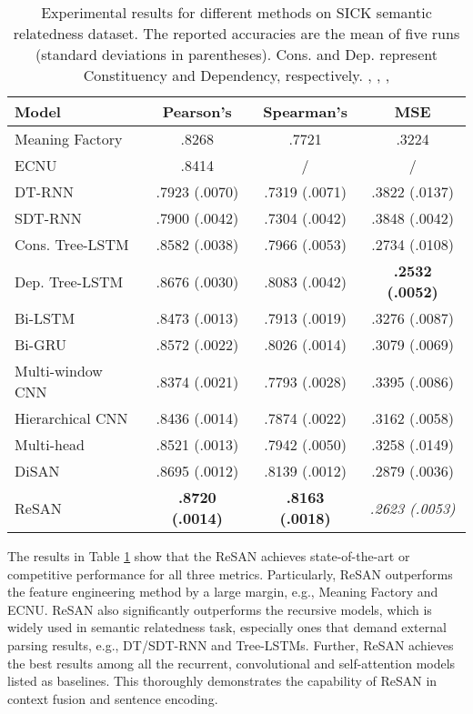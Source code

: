 \documentclass{article}
\begin{document}
\begin{table}[t] \small \centering
	\setlength{\tabcolsep}{1pt}
	\begin{tabular}{@{}lccc@{}}
		\toprule
		\textbf{Model}& \textbf{Pearson's } &\textbf{Spearman's }& \textbf{MSE}  \\ \midrule
		Meaning Factory&            .8268&               .7721&                .3224\\
		ECNU&            .8414&               /&                /\\
		DT-RNN&            .7923 (.0070)&               .7319 (.0071)&               .3822 (.0137) \\ 
		SDT-RNN&            .7900 (.0042)&               .7304 (.0042)&                .3848 (.0042)\\ 
		Cons. Tree-LSTM&            .8582 (.0038)&               .7966 (.0053)&                .2734 (.0108)\\ 
		Dep. Tree-LSTM&            .8676 (.0030)&               .8083 (.0042)&                \textbf{.2532 (.0052)}\\ \midrule
		Bi-LSTM& .8473 (.0013)& .7913 (.0019)& .3276 (.0087)\\
		Bi-GRU& .8572 (.0022)& .8026 (.0014)& .3079 (.0069)\\
		Multi-window CNN& .8374 (.0021)& .7793 (.0028)& .3395 (.0086)\\
		Hierarchical CNN& .8436 (.0014)& .7874 (.0022)& .3162 (.0058)\\
		Multi-head& .8521 (.0013)& .7942 (.0050)& .3258 (.0149)\\
		DiSAN& .8695 (.0012)&  .8139 (.0012)& .2879 (.0036)\\ \midrule
		ReSAN& \textbf{.8720 (.0014)}& \textbf{.8163 (.0018)}& \textit{.2623 (.0053)}\\ \bottomrule
	\end{tabular}
	\caption{ \small Experimental results for different methods on SICK semantic relatedness dataset. The reported accuracies are the mean of five runs (standard deviations in parentheses). Cons. and Dep. represent Constituency and Dependency, respectively. \protect\cite{bjerva2014meaning}, \protect\cite{zhao2014ecnu}, \protect\cite{socher2014grounded}, \protect\cite{tai2015improved}}
	\label{table:exps_sick_accu}
\end{table}

The results in Table \ref{table:exps_sick_accu} show that the ReSAN achieves state-of-the-art or competitive performance for all three metrics. Particularly, ReSAN outperforms the feature engineering method by a large margin, e.g., Meaning Factory and ECNU. ReSAN also significantly outperforms the recursive models, which is widely used in semantic relatedness task, especially ones that demand external parsing results, e.g., DT/SDT-RNN and Tree-LSTMs. Further, ReSAN achieves the best results among all the recurrent, convolutional and self-attention models listed as baselines. This thoroughly demonstrates the capability of ReSAN in context fusion and sentence encoding.
\end{document}
